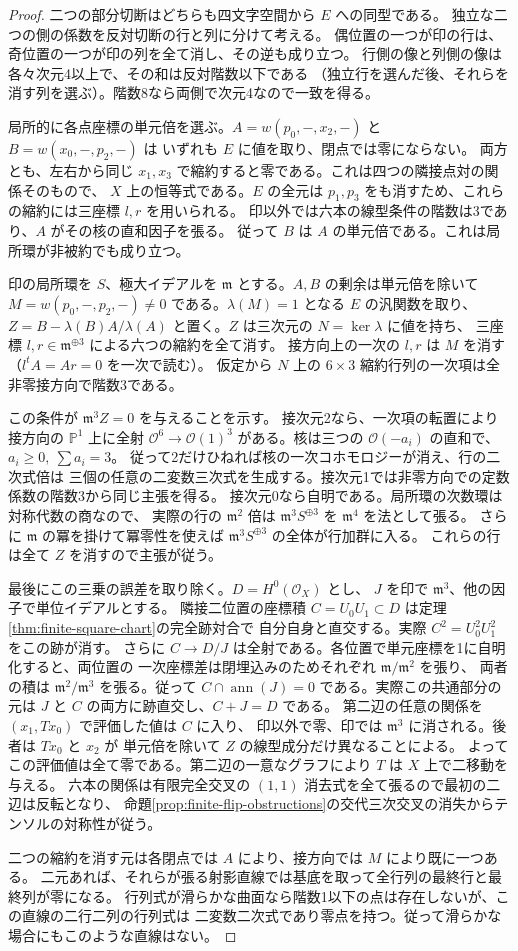 \begin{proof}
二つの部分切断はどちらも四文字空間から $E$ への同型である。
独立な二つの側の係数を反対切断の行と列に分けて考える。
偶位置の一つが印の行は、奇位置の一つが印の列を全て消し、その逆も成り立つ。
行側の像と列側の像は各々次元4以上で、その和は反対階数以下である
（独立行を選んだ後、それらを消す列を選ぶ）。階数8なら両側で次元4なので一致を得る。

局所的に各点座標の単元倍を選ぶ。$A=w(p_0,-,x_2,-)$ と $B=w(x_0,-,p_2,-)$ は
いずれも $E$ に値を取り、閉点では零にならない。
両方とも、左右から同じ $x_1,x_3$ で縮約すると零である。これは四つの隣接点対の関係そのもので、
$X$ 上の恒等式である。$E$ の全元は $p_1,p_3$ をも消すため、これらの縮約には三座標 $l,r$ を用いられる。
印以外では六本の線型条件の階数は3であり、$A$ がその核の直和因子を張る。
従って $B$ は $A$ の単元倍である。これは局所環が非被約でも成り立つ。

印の局所環を $S$、極大イデアルを $\mathfrak m$ とする。$A,B$ の剰余は単元倍を除いて
$M=w(p_0,-,p_2,-)\ne0$ である。$\lambda(M)=1$ となる $E$ の汎関数を取り、
$Z=B-\lambda(B)A/\lambda(A)$ と置く。$Z$ は三次元の $N=\ker\lambda$ に値を持ち、
三座標 $l,r\in\mathfrak m^{\oplus3}$ による六つの縮約を全て消す。
接方向上の一次の $l,r$ は $M$ を消す（$l^tA=Ar=0$ を一次で読む）。
仮定から $N$ 上の $6\times3$ 縮約行列の一次項は全非零接方向で階数3である。

この条件が $\mathfrak m^3Z=0$ を与えることを示す。
接次元2なら、一次項の転置により接方向の $\mathbb P^1$ 上に全射
$\mathcal O^6\to\mathcal O(1)^3$ がある。核は三つの
$\mathcal O(-a_i)$ の直和で、$a_i\ge0,\ \sum a_i=3$。
従って2だけひねれば核の一次コホモロジーが消え、行の二次式倍は
三個の任意の二変数三次式を生成する。接次元1では非零方向での定数係数の階数3から同じ主張を得る。
接次元0なら自明である。局所環の次数環は対称代数の商なので、
実際の行の $\mathfrak m^2$ 倍は $\mathfrak m^3 S^{\oplus3}$ を $\mathfrak m^4$ を法として張る。
さらに $\mathfrak m$ の冪を掛けて冪零性を使えば $\mathfrak m^3 S^{\oplus3}$ の全体が行加群に入る。
これらの行は全て $Z$ を消すので主張が従う。

最後にこの三乗の誤差を取り除く。$D=H^0(\mathcal O_X)$ とし、
$J$ を印で $\mathfrak m^3$、他の因子で単位イデアルとする。
隣接二位置の座標積 $C=U_0U_1\subset D$ は定理\ref{thm:finite-square-chart}の完全跡対合で
自分自身と直交する。実際 $C^2=U_0^2U_1^2$ をこの跡が消す。
さらに $C\to D/J$ は全射である。各位置で単元座標を1に自明化すると、両位置の
一次座標差は閉埋込みのためそれぞれ $\mathfrak m/\mathfrak m^2$ を張り、
両者の積は $\mathfrak m^2/\mathfrak m^3$ を張る。従って
$C\cap\operatorname{ann}(J)=0$ である。実際この共通部分の元は
$J$ と $C$ の両方に跡直交し、$C+J=D$ である。
第二辺の任意の関係を $(x_1,T x_0)$ で評価した値は $C$ に入り、
印以外で零、印では $\mathfrak m^3$ に消される。後者は $T x_0$ と $x_2$ が
単元倍を除いて $Z$ の線型成分だけ異なることによる。
よってこの評価値は全て零である。第二辺の一意なグラフにより $T$ は $X$ 上で二移動を与える。
六本の関係は有限完全交叉の $(1,1)$ 消去式を全て張るので最初の二辺は反転となり、
命題\ref{prop:finite-flip-obstructions}の交代三次交叉の消失からテンソルの対称性が従う。

二つの縮約を消す元は各閉点では $A$ により、接方向では $M$ により既に一つある。
二元あれば、それらが張る射影直線では基底を取って全行列の最終行と最終列が零になる。
行列式が滑らかな曲面なら階数1以下の点は存在しないが、この直線の二行二列の行列式は
二変数二次式であり零点を持つ。従って滑らかな場合にもこのような直線はない。
\end{proof}
